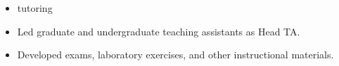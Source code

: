 \begin{itemize}[leftmargin=\parindent]
\begin{itemize}
      \item tutoring

      \item Led graduate and undergraduate teaching assistants as Head TA. 
      \item Developed exams, laboratory exercises, and other instructional materials. 
    \end{itemize}

\end{itemize}





